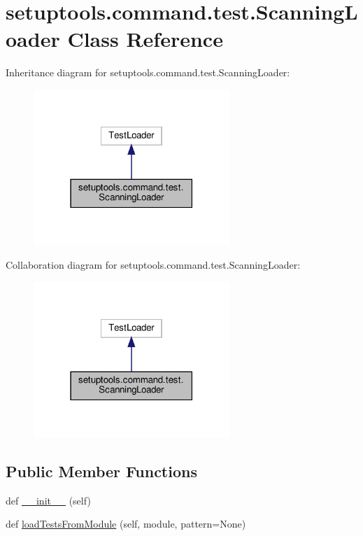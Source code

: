 \hypertarget{classsetuptools_1_1command_1_1test_1_1ScanningLoader}{}\section{setuptools.\+command.\+test.\+Scanning\+Loader Class Reference}
\label{classsetuptools_1_1command_1_1test_1_1ScanningLoader}


Inheritance diagram for setuptools.\+command.\+test.\+Scanning\+Loader\+:
\nopagebreak
\begin{figure}[H]
\begin{center}
\leavevmode
\includegraphics[width=210pt]{classsetuptools_1_1command_1_1test_1_1ScanningLoader__inherit__graph}
\end{center}
\end{figure}


Collaboration diagram for setuptools.\+command.\+test.\+Scanning\+Loader\+:
\nopagebreak
\begin{figure}[H]
\begin{center}
\leavevmode
\includegraphics[width=210pt]{classsetuptools_1_1command_1_1test_1_1ScanningLoader__coll__graph}
\end{center}
\end{figure}
\subsection*{Public Member Functions}
\begin{DoxyCompactItemize}
\item 
def \hyperlink{classsetuptools_1_1command_1_1test_1_1ScanningLoader_a9df24af42cc35c3b5a7cad05769eb3f4}{\+\_\+\+\_\+init\+\_\+\+\_\+} (self)
\item 
def \hyperlink{classsetuptools_1_1command_1_1test_1_1ScanningLoader_a29cd676380d82375863012b7cc1feb80}{load\+Tests\+From\+Module} (self, module, pattern=None)
\end{DoxyCompactItemize}


